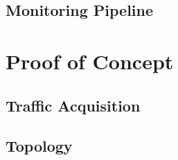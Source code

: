 \textcolor{dimgray}{\lipsum[1]}


\subsection{Monitoring Pipeline}
\label{subsec:monitoring-pipeline}

\textcolor{dimgray}{\lipsum[1]}


\section{Proof of Concept}
\label{sec:poc}

\textcolor{dimgray}{\lipsum[1-10]}


\subsection{Traffic Acquisition}
\label{subsec:traffic-acquisition}

\textcolor{dimgray}{\lipsum}


\subsection{Topology}
\label{subsec:topology}

\textcolor{dimgray}{\lipsum}
